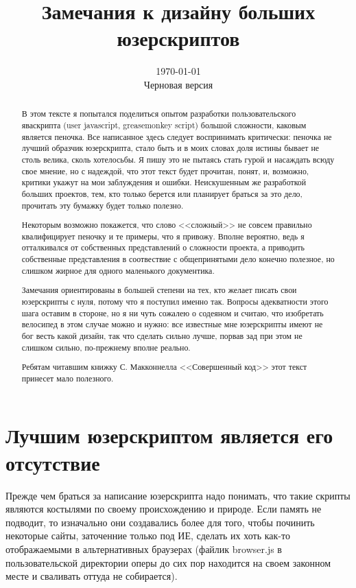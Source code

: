 \documentclass[12pt,a4paper]{article}
\title{Замечания к дизайну больших юзерскриптов}
\date{\today\\
\small Черновая версия}
\begin{document}
\maketitle

\begin{abstract}
В этом тексте я попытался поделиться опытом разработки пользовательского яваскрипта (user javascript, greasemonkey script) большой сложности, каковым является пеночка. Все написанное здесь следует воспринимать критически: пеночка не лучший образчик юзерскрипта, стало быть и в моих словах доля истины бывает не столь велика, сколь хотелосьбы. Я пишу это не пытаясь стать гурой и насаждать всюду свое мнение, но с надеждой, что этот текст будет прочитан, понят, и, возможно, критики укажут на мои заблуждения и ошибки. Неискушенным же разработкой больших проектов, тем, кто только берется или планирует браться за это дело, прочитать эту бумажку будет только полезно.

Некоторым возможно покажется, что слово <<сложный>> не совсем правильно квалифицирует пеночку и те примеры, что я привожу. Вполне вероятно, ведь я отталкивался от собственных представлений о сложности проекта, а приводить собственные представления в соотвествие с общепринятыми дело конечно полезное, но слишком жирное для одного маленького документика. 

Замечания ориентированы в большей степени на тех, кто желает писать свои юзерскрипты с нуля, потому что я поступил именно так. Вопросы адекватности этого шага оставим в стороне, но я ни чуть сожалею о содеяном и считаю, что изобретать велосипед в этом случае можно и нужно: все известные мне юзерскрипты имеют не бог весть какой дизайн, так что сделать сильно лучше, порвав зад при этом не слишком сильно, по-прежнему вполне реально.

Ребятам читавшим книжку С. Макконнелла <<Совершенный код>> этот текст принесет мало полезного.
\end{abstract}

\section{Лучшим юзерскриптом является его отсутствие}

Прежде чем браться за написание юзерскрипта надо понимать, что такие скрипты являются костылями по своему происхождению и природе. Если память не подводит, то изначально они создавались более для того, чтобы починить некоторые сайты, заточенние только под ИЕ, сделать их хоть как-то отображаемыми в альтернативных браузерах (файлик browser.js в пользовательской директории оперы до сих пор находится на своем законном месте и сваливать оттуда не собирается). 
\end{document}
